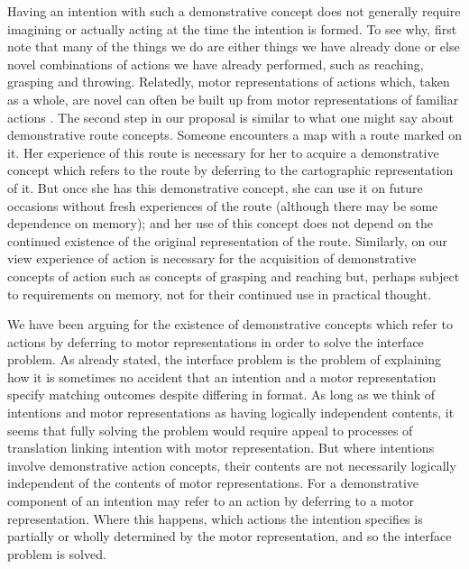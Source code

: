 \documentclass[12pt,\papersize]{extarticle}
\begin{document}
Having an intention with such a demonstrative concept does not generally require imagining or actually acting at the time the intention is formed.  To see why, first note that many of the things we do are either things we have already done or else novel combinations of actions we have already performed, such as reaching, grasping and throwing.  Relatedly, motor representations of actions which, taken as a whole, are novel can often be built up from motor representations of familiar actions \citep[pp.\ 45-49]{rizzolatti_mirrors_2008}.  The second step in our proposal is similar to what one might say about demonstrative route concepts.  Someone encounters a map with a route marked on it.  Her experience of this route is necessary for her to acquire a demonstrative concept which refers to the route by deferring to the cartographic representation of it.  But once she has this demonstrative concept, she can use it on future occasions without fresh experiences of the route (although there may be some dependence on memory); and her use of this concept does not depend on the continued existence of the original representation of the route.  Similarly, on our view experience of action is necessary for the acquisition of demonstrative concepts of action such as concepts of grasping and reaching but, perhaps subject to requirements on memory, not for their continued use in practical thought. 

We have been arguing for the existence of demonstrative concepts which refer to actions by deferring to motor representations in order to solve the interface problem. As already stated, the interface problem is the problem of explaining how it is sometimes no accident that an intention and a motor representation specify matching outcomes despite differing in format. As long as we think of intentions and motor representations as having logically independent contents, it seems that fully solving the problem would require appeal to processes of translation linking intention with motor representation. But where intentions involve demonstrative action concepts, their contents are not necessarily logically independent of the contents of motor representations. For a demonstrative component of an intention may refer to an action by deferring to a motor representation. Where this happens, which actions the intention specifies is partially or wholly determined by the motor representation, and so the interface problem is solved.
\end{document}
